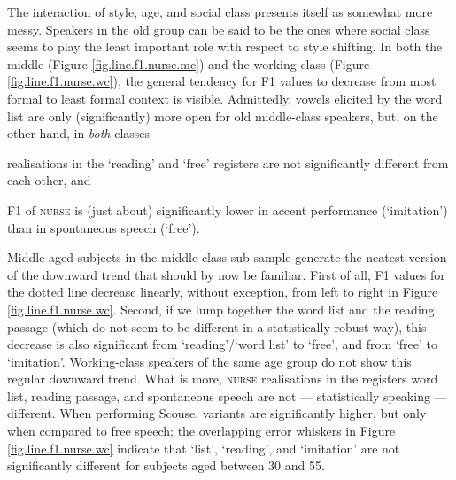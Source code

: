 The interaction of style, age, and social class presents itself as somewhat more messy.
Speakers in the old group can be said to be the ones where social class seems to play the least important role with respect to style shifting.
In both the middle (Figure \ref{fig.line.f1.nurse.mc}) and the working class (Figure \ref{fig.line.f1.nurse.wc}), the general tendency for F1 values to decrease from most formal to least formal context is visible.
Admittedly, vowels elicited by the word list are only (significantly) more open for old middle-class speakers, but, on the other hand, in \emph{both} classes
\begin{inparaenum}[(a)]
	\item realisations in the `reading' and `free' registers are not significantly different from each other, and
	\item F1 of \textsc{nurse} is (just about) significantly lower in accent performance (`imitation') than in spontaneous speech (`free').
\end{inparaenum}

Middle-aged subjects in the middle-class sub-sample generate the neatest version of the downward trend that should by now be familiar.
First of all, F1 values for the dotted line decrease linearly, without exception, from left to right in Figure \ref{fig.line.f1.nurse.wc}.
Second, if we lump together the word list and the reading passage (which do not seem to be different in a statistically robust way), this decrease is also significant from `reading'/`word list' to `free', and from `free' to `imitation'.
Working-class speakers of the same age group do not show this regular downward trend.
What is more, \textsc{nurse} realisations in the registers word list, reading passage, and spontaneous speech are not --- statistically speaking --- different.
When performing Scouse, variants are significantly higher, but only when compared to free speech; the overlapping error whiskers in Figure \ref{fig.line.f1.nurse.wc} indicate that `list', `reading', and `imitation' are not significantly different for subjects aged between 30 and 55.

